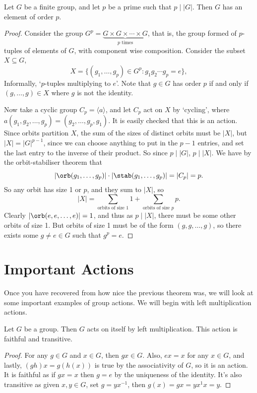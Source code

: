 \documentclass[a4]{scrreprt}
\newcommand{\newsection}{\section}
\begin{document}
\begin{theorem}
	Let $G$ be a finite group, and let $p$ be a prime such that $p \mid |G|$. Then $G$ has an element of order $p$.
\end{theorem}
\begin{proof}
	Consider the group $G^p = \underbrace{G\times G \times \cdots \times G}_{p\text{ times}}$, that is, the group formed of $p$-tuples of elements of $G$, with component wise composition. Consider the subset $X \subseteq G$,
	$$
	X = \{(g_1, \dots, g_p) \in G^p : g_1 g_2 \cdots g_p = e\},
	$$
	Informally, `$p$-tuples multiplying to $e$'. Note that $g \in G$ has order $p$ if and only if $(g, \dots, g) \in X$ where $g$ is not the identity.

	Now take a cyclic group $C_p = \langle a \rangle$, and let $C_p$ act on $X$ by `cycling', where $a(g_1, g_2, \dots, g_p) = (g_2, \dots, g_p, g_1)$. It is easily checked that this is an action.
	Since orbits partition $X$, the sum of the sizes of distinct orbits must be $|X|$, but $|X| = |G|^{p - 1}$, since we can choose anything to put in the $p - 1$ entries, and set the last entry to the inverse of their product. So since $p \mid |G|$, $p \mid |X|$. We have by the orbit-stabiliser theorem that
	$$
	|\orb(g_1, \dots, g_p)| \cdot |\stab(g_1, \dots, g_p)| = |C_p| = p.
	$$
	So any orbit has size 1 or $p$, and they sum to $|X|$, so
	$$
	|X| = \sum_{\text{orbits of size 1}} 1 + \sum_{\text{orbits of size $p$}} p.
	$$
	Clearly $|\orb(e, e, \dots, e)| = 1$, and thus as $p \mid |X|$, there must be some other orbits of size 1.
	But orbits of size 1 must be of the form $(g, g, \dots, g)$, so there exists some $g \neq e \in G$ such that $g^p = e$.
\end{proof}

\newsection{Important Actions}

Once you have recovered from how nice the previous theorem was, we will look at some important examples of group actions. We will begin with left multiplication actions.

\begin{lemma}
	Let $G$ be a group. Then $G$ acts on itself by left multiplication. This action is faithful and transitive.
\end{lemma}
\begin{proof}
	For any $g \in G$ and $x \in G$, then $gx \in G$. Also, $ex = x$ for any $x \in G$, and lastly, $(gh)x = g(h(x))$ is true by the associativity of $G$, so it is an action. It is faithful as if $gx = x$ then $g = e$ by the uniqueness of the identity. It's also transitive as given $x, y \in G$, set $g = yx^{-1}$, then $g(x) = gx = yx^{1}x = y$. 
\end{proof}
\end{document}
